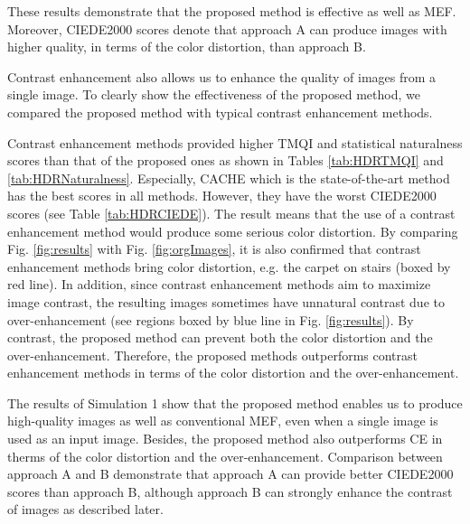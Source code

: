 \documentclass[paper]{ieice}
\begin{document}
\begin{description}[style=nextline,font=\mdseries,leftmargin=0pt,listparindent=2em,parsep=1pt]
      These results demonstrate that the proposed method is effective as well as MEF.
      Moreover, CIEDE2000 scores denote that approach A
      can produce images with higher quality, in terms of the color distortion,
      than approach B.
    \item[b) Comparison with contrast enhancement methods]
      Contrast enhancement also allows us to enhance the quality of images from a single image.
      To clearly show the effectiveness of the proposed method,
      we compared the proposed method with typical contrast enhancement methods.
      
      Contrast enhancement methods provided higher TMQI and statistical naturalness scores
      than that of the proposed ones as shown in
      Tables \ref{tab:HDRTMQI} and \ref{tab:HDRNaturalness}.
      Especially, CACHE which is the state-of-the-art method has the best scores in all methods.
      However, they have the worst CIEDE2000 scores (see Table \ref{tab:HDRCIEDE}).
      The result means that the use of a contrast enhancement method would
      produce some serious color distortion.
      By comparing Fig. \ref{fig:results} with Fig. \ref{fig:orgImages},
      it is also confirmed that contrast enhancement methods bring color distortion,
      e.g. the carpet on stairs (boxed by red line).
      In addition, since contrast enhancement methods aim to maximize image contrast,
      the resulting images sometimes have unnatural contrast
      due to over-enhancement
      (see regions boxed by blue line in Fig. \ref{fig:results}).
      By contrast, the proposed method can prevent both the color distortion
      and the over-enhancement.
      Therefore, the proposed methods outperforms contrast enhancement methods
      in terms of the color distortion
      and the over-enhancement.

      The results of Simulation 1 show that the proposed method
      enables us to produce high-quality images as well as conventional MEF,
      even when a single image is used as an input image.
      Besides, the proposed method also outperforms CE
      in therms of the color distortion and the over-enhancement.
      Comparison between approach A and B demonstrate that approach A can provide better
      CIEDE2000 scores than approach B,
      although approach B can strongly enhance the contrast of images as described later.
  \end{description}
%
\end{document}
